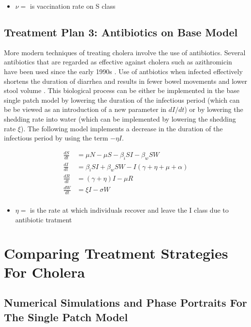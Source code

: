 \documentclass[12pt]{article}\usepackage[]{graphicx}\usepackage[]{color}
\begin{document}
\begin{itemize}
	\item $\nu=$ is vaccination rate on S class
\end{itemize}

\subsection{Treatment Plan 3: Antibiotics on Base Model}
More modern techniques of treating cholera involve the use of antibiotics. Several antibiotics that are regarded as effective against cholera such as azithromicin have been used since the early 1990s \citep{link23}.
Use of antbiotics when infected effectively shortens the duration of diarrhea and results in fewer bowel movements and lower stool volume \citep{link24}. This biological process can be either be implemented in the base single patch model by lowering the duration of the infectious period (which can be be viewed as an introduction of a new parameter in $dI/dt$) or by lowering the shedding rate into water (which can be implemented by lowering the shedding rate $\xi$).
The following model implements a decrease in the duration of the infectious period by using the term $ - \eta I$.
\begin{linenomath}
\begin{align*}
	\frac{dS}{dt}&= \mu N - \mu S - \beta_i SI - \beta_w S W \\
	\frac{dI}{dt}&= \beta_i S I + \beta_w S W - I (\gamma +\eta + \mu + \alpha ) \\
	\frac{dR}{dt}&= (\gamma +\eta)I - \mu R \\
	\frac{dW}{dt}&= \xi I  - \sigma W\\
\end{align*}
\end{linenomath}
\begin{itemize}
	\item $\eta=$ is the rate at which individuals recover and leave the I class due to antibiotic tratment
\end{itemize}

\section{Comparing Treatment Strategies For Cholera}
\subsection{Numerical Simulations and Phase Portraits For The Single Patch Model}
\end{document}
